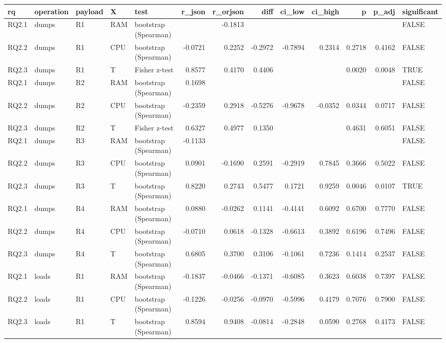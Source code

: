 \begin{table}[ht]
\centering
\begin{tabular}{lllllrrrrrrrl}
  \toprule
rq & operation & payload & X & test & r\_json & r\_orjson & diff & ci\_low & ci\_high & p & p\_adj & significant \\ 
  \midrule
RQ2.1 & dumps & R1 & RAM & bootstrap (Spearman) &  & -0.1813 &  &  &  &  &  & FALSE \\ 
  RQ2.2 & dumps & R1 & CPU & bootstrap (Spearman) & -0.0721 & 0.2252 & -0.2972 & -0.7894 & 0.2314 & 0.2718 & 0.4162 & FALSE \\ 
  RQ2.3 & dumps & R1 & T & Fisher z-test & 0.8577 & 0.4170 & 0.4406 &  &  & 0.0020 & 0.0048 & TRUE \\ 
  RQ2.1 & dumps & R2 & RAM & bootstrap (Spearman) & 0.1698 &  &  &  &  &  &  & FALSE \\ 
  RQ2.2 & dumps & R2 & CPU & bootstrap (Spearman) & -0.2359 & 0.2918 & -0.5276 & -0.9678 & -0.0352 & 0.0344 & 0.0717 & FALSE \\ 
  RQ2.3 & dumps & R2 & T & Fisher z-test & 0.6327 & 0.4977 & 0.1350 &  &  & 0.4631 & 0.6051 & FALSE \\ 
  RQ2.1 & dumps & R3 & RAM & bootstrap (Spearman) & -0.1133 &  &  &  &  &  &  & FALSE \\ 
  RQ2.2 & dumps & R3 & CPU & bootstrap (Spearman) & 0.0901 & -0.1690 & 0.2591 & -0.2919 & 0.7845 & 0.3666 & 0.5022 & FALSE \\ 
  RQ2.3 & dumps & R3 & T & bootstrap (Spearman) & 0.8220 & 0.2743 & 0.5477 & 0.1721 & 0.9259 & 0.0046 & 0.0107 & TRUE \\ 
  RQ2.1 & dumps & R4 & RAM & bootstrap (Spearman) & 0.0880 & -0.0262 & 0.1141 & -0.4141 & 0.6092 & 0.6700 & 0.7770 & FALSE \\ 
  RQ2.2 & dumps & R4 & CPU & bootstrap (Spearman) & -0.0710 & 0.0618 & -0.1328 & -0.6613 & 0.3892 & 0.6196 & 0.7496 & FALSE \\ 
  RQ2.3 & dumps & R4 & T & bootstrap (Spearman) & 0.6805 & 0.3700 & 0.3106 & -0.1061 & 0.7236 & 0.1414 & 0.2537 & FALSE \\ 
  RQ2.1 & loads & R1 & RAM & bootstrap (Spearman) & -0.1837 & -0.0466 & -0.1371 & -0.6085 & 0.3623 & 0.6038 & 0.7397 & FALSE \\ 
  RQ2.2 & loads & R1 & CPU & bootstrap (Spearman) & -0.1226 & -0.0256 & -0.0970 & -0.5996 & 0.4179 & 0.7076 & 0.7900 & FALSE \\ 
  RQ2.3 & loads & R1 & T & bootstrap (Spearman) & 0.8594 & 0.9408 & -0.0814 & -0.2848 & 0.0590 & 0.2768 & 0.4173 & FALSE \\ 

\end{tabular}
\end{table}
